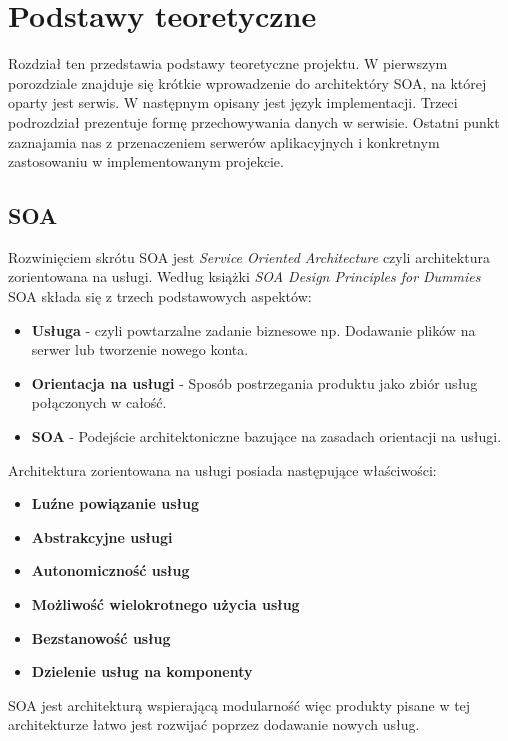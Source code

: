 \chapter{Podstawy teoretyczne}
\label{cha:podstawyTeoretyczne}
Rozdział ten przedstawia podstawy teoretyczne projektu. W pierwszym porozdziale znajduje się krótkie wprowadzenie do architektóry SOA, na której oparty jest serwis. W następnym opisany jest język implementacji. Trzeci podrozdział prezentuje formę przechowywania danych w serwisie. Ostatni punkt zaznajamia nas z przenaczeniem serwerów aplikacyjnych i konkretnym zastosowaniu w implementowanym projekcie.


\section{SOA}
\label{sec:soa}

Rozwinięciem skrótu SOA jest \textit{Service Oriented Architecture} czyli architektura zorientowana na usługi. Według książki \textit{SOA Design Principles for Dummies} SOA składa się z trzech podstawowych aspektów:
\begin{itemize}
	\item \textbf{Usługa} - czyli powtarzalne zadanie biznesowe np. Dodawanie plików na serwer lub tworzenie nowego konta.
	\item \textbf{Orientacja na usługi} - Sposób postrzegania produktu jako zbiór usług połączonych w całość.
	\item \textbf{SOA} - Podejście architektoniczne bazujące na zasadach orientacji na usługi.
\end{itemize}
Architektura zorientowana na usługi posiada następujące właściwości:
\begin{itemize}
	\item \textbf{Luźne powiązanie usług}
	\item \textbf{Abstrakcyjne usługi}
	\item \textbf{Autonomiczność usług}
	\item \textbf{Możliwość wielokrotnego użycia usług}
	\item \textbf{Bezstanowość usług}
	\item \textbf{Dzielenie usług na komponenty}
\end{itemize}
\cite{SOA13}
SOA jest architekturą wspierającą modularność więc produkty pisane w tej architekturze łatwo jest rozwijać poprzez dodawanie nowych usług. \newline

